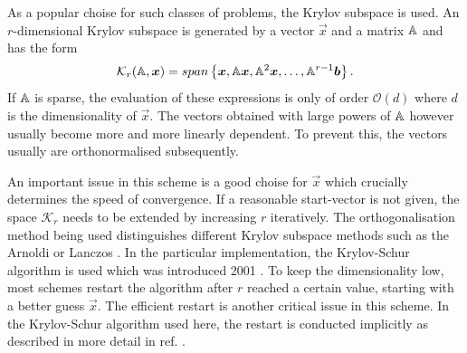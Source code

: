 As a popular choise for such classes of problems, the Krylov subspace is used.
An $r$-dimensional Krylov subspace is generated by a vector $\vec{x}$ and a matrix $\mathbb{A}$ and has the form
\begin{equation}
   \mathcal{K}_r(\mathbb{A},\bm{x})=span\left\{ \bm{x},\mathbb{A}\bm{x},\mathbb{A}^2\bm{x},\hdots,\mathbb{A}^{r-1}\bm{b} \right\}.
\end{equation}
If $\mathbb{A}$ is sparse, the evaluation of these expressions is only of order $\mathcal{O}(d)$ where $d$ is the dimensionality of $\vec{x}$.
The vectors obtained with large powers of $\mathbb{A}$ however usually become more and more linearly dependent.
To prevent this, the vectors usually are orthonormalised subsequently.

An important issue in this scheme is a good choise for $\vec{x}$ which crucially determines the speed of convergence.
If a reasonable start-vector is not given, the space $\mathcal{K}_r$ needs to be extended by increasing $r$ iteratively.
The orthogonalisation method being used distinguishes different Krylov subspace methods such as the Arnoldi \cite{str-4} or Lanczos \cite{str-5}.
In the particular implementation, the Krylov-Schur algorithm is used \cite{str-7} which was introduced 2001 \cite{KrSch}.
To keep the dimensionality low, most schemes restart the algorithm after $r$ reached a certain value, starting with a better guess $\vec{x}$.
The efficient restart is another critical issue in this scheme.
In the Krylov-Schur algorithm \cite{KrSch} used here, the restart is conducted implicitly as described in more detail in ref. \cite{str-7}.

%
%

